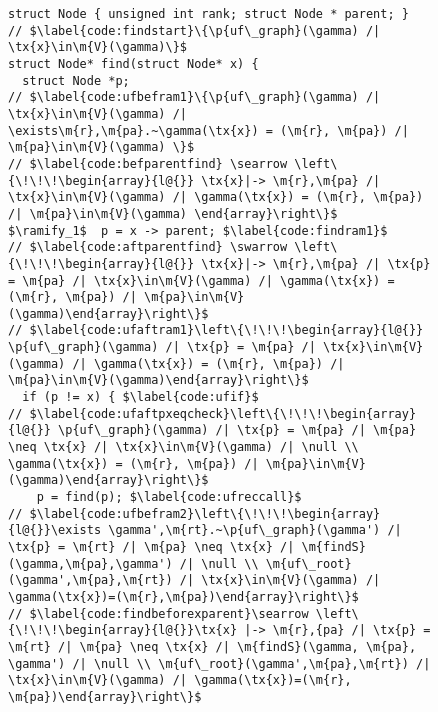 \begin{figure}[t]
\vspace{-1ex}
  \begin{lstlisting}
struct Node { unsigned int rank; struct Node * parent; }
// $\label{code:findstart}\{\p{uf\_graph}(\gamma) /| \tx{x}\in\m{V}(\gamma)\}$
struct Node* find(struct Node* x) {
  struct Node *p;
// $\label{code:ufbefram1}\{\p{uf\_graph}(\gamma) /| \tx{x}\in\m{V}(\gamma) /| \exists\m{r},\m{pa}.~\gamma(\tx{x}) = (\m{r}, \m{pa}) /| \m{pa}\in\m{V}(\gamma) \}$
// $\label{code:befparentfind} \searrow \left\{\!\!\!\begin{array}{l@{}} \tx{x}|-> \m{r},\m{pa} /| \tx{x}\in\m{V}(\gamma) /| \gamma(\tx{x}) = (\m{r}, \m{pa}) /| \m{pa}\in\m{V}(\gamma) \end{array}\right\}$
$\ramify_1$  p = x -> parent; $\label{code:findram1}$
// $\label{code:aftparentfind} \swarrow \left\{\!\!\!\begin{array}{l@{}} \tx{x}|-> \m{r},\m{pa} /| \tx{p} = \m{pa} /| \tx{x}\in\m{V}(\gamma) /| \gamma(\tx{x}) = (\m{r}, \m{pa}) /| \m{pa}\in\m{V}(\gamma)\end{array}\right\}$
// $\label{code:ufaftram1}\left\{\!\!\!\begin{array}{l@{}} \p{uf\_graph}(\gamma) /| \tx{p} = \m{pa} /| \tx{x}\in\m{V}(\gamma) /| \gamma(\tx{x}) = (\m{r}, \m{pa}) /| \m{pa}\in\m{V}(\gamma)\end{array}\right\}$
  if (p != x) { $\label{code:ufif}$
// $\label{code:ufaftpxeqcheck}\left\{\!\!\!\begin{array}{l@{}} \p{uf\_graph}(\gamma) /| \tx{p} = \m{pa} /| \m{pa} \neq \tx{x} /| \tx{x}\in\m{V}(\gamma) /| \null \\ \gamma(\tx{x}) = (\m{r}, \m{pa}) /| \m{pa}\in\m{V}(\gamma)\end{array}\right\}$
    p = find(p); $\label{code:ufreccall}$
// $\label{code:ufbefram2}\left\{\!\!\!\begin{array}{l@{}}\exists \gamma',\m{rt}.~\p{uf\_graph}(\gamma') /| \tx{p} = \m{rt} /| \m{pa} \neq \tx{x} /| \m{findS}(\gamma,\m{pa},\gamma') /| \null \\ \m{uf\_root}(\gamma',\m{pa},\m{rt}) /| \tx{x}\in\m{V}(\gamma) /| \gamma(\tx{x})=(\m{r},\m{pa})\end{array}\right\}$
// $\label{code:findbeforexparent}\searrow \left\{\!\!\!\begin{array}{l@{}}\tx{x} |-> \m{r},{pa} /| \tx{p} = \m{rt} /| \m{pa} \neq \tx{x} /| \m{findS}(\gamma, \m{pa}, \gamma') /| \null \\ \m{uf\_root}(\gamma',\m{pa},\m{rt}) /| \tx{x}\in\m{V}(\gamma) /| \gamma(\tx{x})=(\m{r}, \m{pa})\end{array}\right\}$

\end{lstlisting}
\end{figure}
